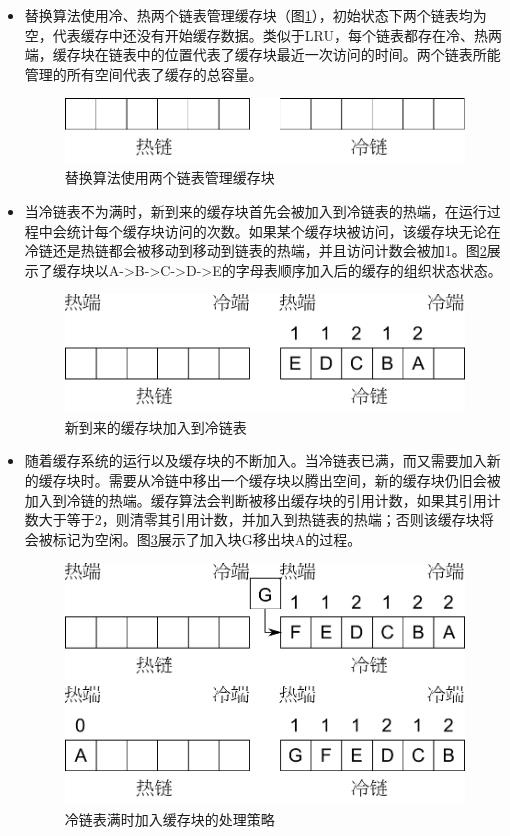 \begin{itemize}
\item
替换算法使用冷、热两个链表管理缓存块（图\ref{fig:replace-algo-1}），初始状态下两个链表均为空，代表缓存中还没有开始缓存数据。类似于LRU，每个链表都存在冷、热两端，缓存块在链表中的位置代表了缓存块最近一次访问的时间。两个链表所能管理的所有空间代表了缓存的总容量。
\begin{figure}[H]
\centering
\includegraphics[width=0.6\linewidth]{./graph/replace-algo-1}
\caption{替换算法使用两个链表管理缓存块}
\label{fig:replace-algo-1}
\end{figure}

\item
当冷链表不为满时，新到来的缓存块首先会被加入到冷链表的热端，在运行过程中会统计每个缓存块访问的次数。如果某个缓存块被访问，该缓存块无论在冷链还是热链都会被移动到移动到链表的热端，并且访问计数会被加1。图\ref{fig:replace-algo-2}展示了缓存块以A->B->C->D->E的字母表顺序加入后的缓存的组织状态状态。
\begin{figure}[H]
\centering
\includegraphics[width=0.6\linewidth]{./graph/replace-algo-2}
\caption{新到来的缓存块加入到冷链表}
\label{fig:replace-algo-2}
\end{figure}

\item
随着缓存系统的运行以及缓存块的不断加入。当冷链表已满，而又需要加入新的缓存块时。需要从冷链中移出一个缓存块以腾出空间，新的缓存块仍旧会被加入到冷链的热端。缓存算法会判断被移出缓存块的引用计数，如果其引用计数大于等于2，则清零其引用计数，并加入到热链表的热端；否则该缓存块将会被标记为空闲。图\ref{fig:replace-algo-3}展示了加入块G移出块A的过程。
\begin{figure}[H]
\centering
\includegraphics[width=0.6\linewidth]{./graph/replace-algo-3}
\caption{冷链表满时加入缓存块的处理策略}
\label{fig:replace-algo-3}
\end{figure}


\end{itemize}
